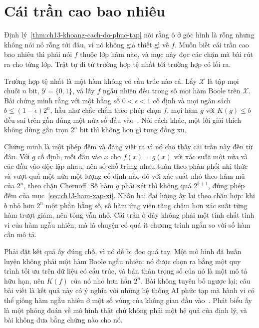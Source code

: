 \section{Cái trần cao bao nhiêu}
\label{sec:ch13-tran-cao-bao-nhieu}

%
Định lý~\ref{thm:ch13-khoang-cach-do-phuc-tap} nói rằng ô ở góc hình là rỗng
nhưng không nói nó rỗng tới đâu, vì nó không giả thiết gì về $f$. Muốn biết cái
trần cao bao nhiêu thì phải nói $f$ thuộc lớp hàm nào, và mục này đọc các chặn
mà bài rút ra cho từng lớp. Trật tự đi từ trường hợp tệ nhất tới trường hợp có
lối ra.

%
Trường hợp tệ nhất là một hàm không có cấu trúc nào cả. Lấy $\mathcal{X}$ là tập
mọi chuỗi $n$ bit, $\mathcal{Y} = \{0,1\}$, và lấy $f$ ngẫu nhiên đều trong số
mọi hàm Boole trên $\mathcal{X}$. Bài chứng minh rằng với một hằng số
$0 < \epsilon < 1$ cố định và mọi ngân sách $b \le (1-\epsilon)2^n$, hầu như
chắc chắn theo phép chọn $f$, mọi hàm $g$ với $K(g) \le b$ đều sai trên gần đúng
một nửa số đầu vào~\autocite{p26limits}. Nói cách khác, một lời giải thích không
dùng gần trọn $2^n$ bit thì không hơn gì tung đồng xu.

Chứng minh là một phép đếm và đáng viết ra vì nó cho thấy cái trần này đến từ
đâu. Với $g$ cố định, mỗi đầu vào $x$ cho $f(x) = g(x)$ với xác suất một nửa và
các đầu vào độc lập nhau, nên số chỗ trùng nhau tuân theo phân phối nhị thức và
vượt quá một nửa một lượng cố định nào đó với xác suất nhỏ theo hàm mũ của
$2^n$, theo chặn Chernoff. Số hàm $g$ phải xét thì không quá $2^{b+1}$, đúng
phép đếm của
mục~\ref{sec:ch13-ham-xap-xi}. Nhân hai đại lượng ấy lại theo chặn hợp: khi $b$
nhỏ hơn $2^n$ một phần hằng số, số hàm ứng viên tăng chậm hơn xác suất từng hàm
trượt giảm, nên tổng vẫn nhỏ. Cái trần ở đây không phải một tính chất tinh vi
của hàm ngẫu nhiên, mà là chuyện có quá ít chương trình ngắn so với số hàm cần
mô tả.

Phải đặt kết quả ấy đúng chỗ, vì nó dễ bị đọc quá tay. Một mô hình đã huấn luyện
không phải một hàm Boole ngẫu nhiên: nó được chọn ra bằng một quy trình tối ưu
trên dữ liệu có cấu trúc, và bản thân trọng số của nó là một mô tả hữu hạn, nên
$K(f)$ của nó nhỏ hơn hẳn $2^n$. Bài không tuyên bố ngược lại; câu bài viết là
kết quả này có ý nghĩa với những hệ thống AI phức tạp mà hành vi có thể giống
hàm ngẫu nhiên ở một số vùng của không gian đầu vào~\autocite{p26limits}. Phát
biểu ấy là một phỏng đoán về mô hình thật chứ không phải một hệ quả của định lý,
và bài không đưa bằng chứng nào cho nó.

